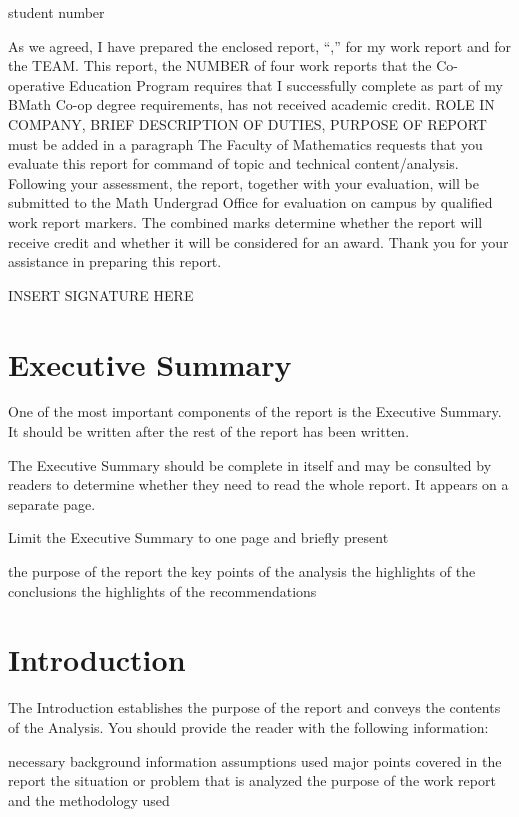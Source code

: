 \documentclass{article}
\begin{document}
 {student number}

\newpage


As we agreed, I have prepared the enclosed report, “\WTT,” for
my \term work report and for the TEAM. This
report, the NUMBER of four work reports that the Co-operative Education Program
requires that I successfully complete as part of my BMath Co-op degree
requirements, has not received academic credit.
\vskip 10pt
ROLE IN COMPANY, BRIEF DESCRIPTION OF DUTIES, PURPOSE OF REPORT must be added in a paragraph
\vskip 10pt 
The Faculty of Mathematics requests that you evaluate this report for command
of topic and technical content/analysis. Following your assessment, the report,
together with your evaluation, will be submitted to the Math Undergrad Office
for evaluation on campus by qualified work report markers. The combined
marks determine whether the report will receive credit and whether it will be
considered for an award.
Thank you for your assistance in preparing this report.

INSERT SIGNATURE HERE
\newpage

\header 
\tableofcontents
\listoffigures

\newpage
\section*{Executive Summary}
One of the most important components of the report is the Executive Summary. It should be written after the rest of the report has been written.

The Executive Summary should be complete in itself and may be consulted by readers to determine whether they need to read the whole report. It appears on a separate page.

Limit the Executive Summary to one page and briefly present

the purpose of the report
the key points of the analysis
the highlights of the conclusions
the highlights of the recommendations
\newpage
{}
\section{Introduction}
The Introduction establishes the purpose of the report and conveys the contents of the Analysis. You should provide the reader with the following information:

necessary background information
assumptions used
major points covered in the report
the situation or problem that is analyzed
the purpose of the work report and the methodology used
\end{document}
